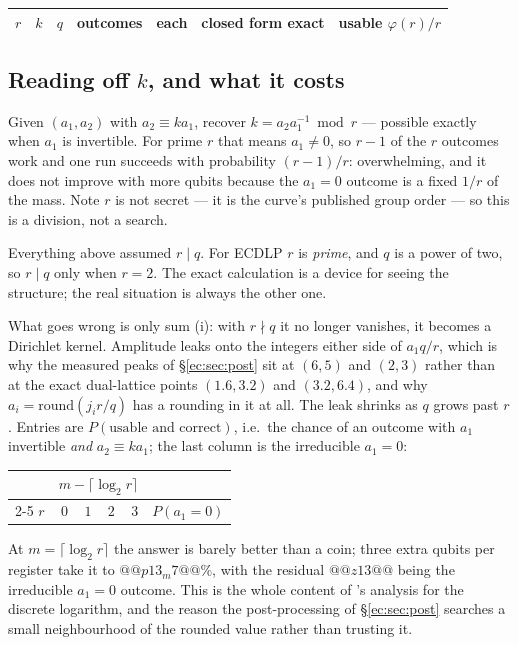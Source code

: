 \begin{center}\small
\begin{tabular}{@{}rrrrrcr@{}}
\toprule
$r$ & $k$ & $q$ & outcomes & each & closed form exact & usable $\varphi(r)/r$\\
\midrule
\bottomrule
\end{tabular}
\end{center}

\subsection{Reading off $k$, and what it costs}

Given $(a_1,a_2)$ with $a_2\equiv ka_1$, recover $k=a_2a_1^{-1}\bmod r$ --- possible exactly when
$a_1$ is invertible. For prime $r$ that means $a_1\neq0$, so $r-1$ of the $r$ outcomes work and one
run succeeds with probability $(r-1)/r$: overwhelming, and it does not improve with more qubits
because the $a_1=0$ outcome is a fixed $1/r$ of the mass. Note $r$ is not secret --- it is the
curve's published group order --- so this is a division, not a search.

\begin{warnbox}[title={The clean case never actually happens}]
Everything above assumed $r\mid q$. For ECDLP $r$ is \emph{prime}, and $q$ is a power of two, so
$r\mid q$ only when $r=2$. The exact calculation is a device for seeing the structure; the real
situation is always the other one.

What goes wrong is only sum (i): with $r\nmid q$ it no longer vanishes, it becomes a Dirichlet
kernel. Amplitude leaks onto the integers either side of $a_1q/r$, which is why the measured peaks
of \S\ref{ec:sec:post} sit at $(6,5)$ and $(2,3)$ rather than at the exact dual-lattice points
$(1.6,3.2)$ and $(3.2,6.4)$, and why $a_i=\mathrm{round}(j_ir/q)$ has a rounding in it at all. The
leak shrinks as $q$ grows past $r$. Entries are $P(\text{usable and correct})$, i.e.\ the chance
of an outcome with $a_1$ invertible \emph{and} $a_2\equiv ka_1$; the last column is the irreducible
$a_1=0$:

\begin{center}\small
\begin{tabular}{@{}rrrrrr@{}}
\toprule
& \multicolumn{4}{c}{$m-\lceil\log_2 r\rceil$} & \\
\cmidrule(lr){2-5}
$r$ & $0$ & $1$ & $2$ & $3$ & $P(a_1{=}0)$\\
\midrule
\bottomrule
\end{tabular}
\end{center}

\noindent
At $m=\lceil\log_2 r\rceil$ the answer is barely better than a coin; three extra qubits per register
take it to $@@p13_m7@@\%$, with the residual $@@z13@@$ being the irreducible $a_1=0$ outcome. This
is the whole content of \cite{ec:ekera}'s analysis for the discrete logarithm, and the reason the
post-processing of \S\ref{ec:sec:post} searches a small neighbourhood of the rounded value rather
than trusting it.
\end{warnbox}

